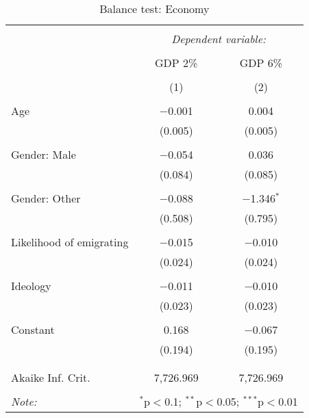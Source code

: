\documentclass[12pt]{article}
\begin{document}
\begin{appendices}
\begin{table}[!htbp] \centering 
  \caption{Balance test: Economy} 
  \label{tab:balance2} 
\begin{tabular}{@{\extracolsep{5pt}}lcc} 
\\[-1.8ex]\hline 
\hline \\[-1.8ex] 
 & \multicolumn{2}{c}{\textit{Dependent variable:}} \\ 
\cline{2-3} 
\\[-1.8ex] & GDP 2\% & GDP 6\% \\ 
\\[-1.8ex] & (1) & (2)\\ 
\hline \\[-1.8ex] 
 Age & $-$0.001 & 0.004 \\ 
  & (0.005) & (0.005) \\ 
  & & \\ 
 Gender: Male & $-$0.054 & 0.036 \\ 
  & (0.084) & (0.085) \\ 
  & & \\ 
 Gender: Other & $-$0.088 & $-$1.346$^{*}$ \\ 
  & (0.508) & (0.795) \\ 
  & & \\ 
 Likelihood of emigrating & $-$0.015 & $-$0.010 \\ 
  & (0.024) & (0.024) \\ 
  & & \\ 
 Ideology & $-$0.011 & $-$0.010 \\ 
  & (0.023) & (0.023) \\ 
  & & \\ 
 Constant & 0.168 & $-$0.067 \\ 
  & (0.194) & (0.195) \\ 
  & & \\ 
\hline \\[-1.8ex] 
Akaike Inf. Crit. & 7,726.969 & 7,726.969 \\
\hline 
\hline \\[-1.8ex] 
\textit{Note:}  & \multicolumn{2}{r}{$^{*}$p$<$0.1; $^{**}$p$<$0.05; $^{***}$p$<$0.01} \\ 
\end{tabular} 
\end{table} 


\end{appendices}
\end{document}
